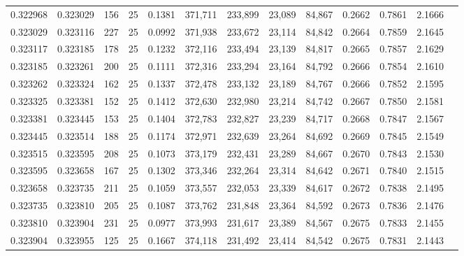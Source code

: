 \begin{tabular}{rrrrrrrrrrrrr}
0.322968 & 0.323029 &   156 &  25 &                                     0.1381 & 371,711 & 233,899 &  23,089 &  84,867 & 0.2662 & 0.7861 & 2.1666 \\
0.323029 & 0.323116 &   227 &  25 &                                     0.0992 & 371,938 & 233,672 &  23,114 &  84,842 & 0.2664 & 0.7859 & 2.1645 \\
0.323117 & 0.323185 &   178 &  25 &                                     0.1232 & 372,116 & 233,494 &  23,139 &  84,817 & 0.2665 & 0.7857 & 2.1629 \\
0.323185 & 0.323261 &   200 &  25 &                                     0.1111 & 372,316 & 233,294 &  23,164 &  84,792 & 0.2666 & 0.7854 & 2.1610 \\
0.323262 & 0.323324 &   162 &  25 &                                     0.1337 & 372,478 & 233,132 &  23,189 &  84,767 & 0.2666 & 0.7852 & 2.1595 \\
0.323325 & 0.323381 &   152 &  25 &                                     0.1412 & 372,630 & 232,980 &  23,214 &  84,742 & 0.2667 & 0.7850 & 2.1581 \\
0.323381 & 0.323445 &   153 &  25 &                                     0.1404 & 372,783 & 232,827 &  23,239 &  84,717 & 0.2668 & 0.7847 & 2.1567 \\
0.323445 & 0.323514 &   188 &  25 &                                     0.1174 & 372,971 & 232,639 &  23,264 &  84,692 & 0.2669 & 0.7845 & 2.1549 \\
0.323515 & 0.323595 &   208 &  25 &                                     0.1073 & 373,179 & 232,431 &  23,289 &  84,667 & 0.2670 & 0.7843 & 2.1530 \\
0.323595 & 0.323658 &   167 &  25 &                                     0.1302 & 373,346 & 232,264 &  23,314 &  84,642 & 0.2671 & 0.7840 & 2.1515 \\
0.323658 & 0.323735 &   211 &  25 &                                     0.1059 & 373,557 & 232,053 &  23,339 &  84,617 & 0.2672 & 0.7838 & 2.1495 \\
0.323735 & 0.323810 &   205 &  25 &                                     0.1087 & 373,762 & 231,848 &  23,364 &  84,592 & 0.2673 & 0.7836 & 2.1476 \\
0.323810 & 0.323904 &   231 &  25 &                                     0.0977 & 373,993 & 231,617 &  23,389 &  84,567 & 0.2675 & 0.7833 & 2.1455 \\
0.323904 & 0.323955 &   125 &  25 &                                     0.1667 & 374,118 & 231,492 &  23,414 &  84,542 & 0.2675 & 0.7831 & 2.1443 \\

\end{tabular}
